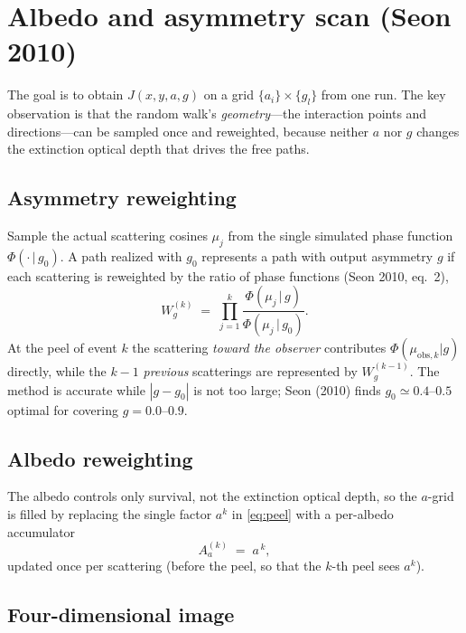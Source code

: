 \documentclass[english,a4paper]{kiseon_memo}
\newcommand{\obs}{\mathrm{obs}}
\newcommand{\HG}{\Phi}
\begin{document}
\section{Albedo and asymmetry scan (Seon 2010)}

The goal is to obtain $J(x,y,a,g)$ on a grid $\{a_i\}\times\{g_l\}$ from one run.
The key observation is that the random walk's \emph{geometry}---the interaction
points and directions---can be sampled once and reweighted, because neither $a$
nor $g$ changes the extinction optical depth that drives the free paths.

\subsection{Asymmetry reweighting}

Sample the actual scattering cosines $\mu_j$ from the single simulated phase
function $\HG(\cdot\,|\,g_0)$.  A path realized with $g_0$ represents a path with
output asymmetry $g$ if each scattering is reweighted by the ratio of phase
functions (Seon 2010, eq.~2),
\begin{equation}
  W_g^{(k)} \;=\; \prod_{j=1}^{k}
  \frac{\HG(\mu_j\,|\,g)}{\HG(\mu_j\,|\,g_0)} .
  \label{eq:Wg}
\end{equation}
At the peel of event $k$ the scattering \emph{toward the observer} contributes
$\HG(\mu_{\obs,k}|g)$ directly, while the $k-1$ \emph{previous} scatterings are
represented by $W_g^{(k-1)}$.  The method is accurate while $|g-g_0|$ is not too
large; Seon (2010) finds $g_0\simeq0.4$--$0.5$ optimal for covering
$g=0.0$--$0.9$.

\subsection{Albedo reweighting}

The albedo controls only survival, not the extinction optical depth, so the
$a$-grid is filled by replacing the single factor $a^k$ in \eqref{eq:peel} with a
per-albedo accumulator
\begin{equation}
  A_a^{(k)} \;=\; a^{\,k} ,
  \label{eq:Aa}
\end{equation}
updated once per scattering (before the peel, so that the $k$-th peel sees
$a^{k}$).

\subsection{Four-dimensional image}
\end{document}
